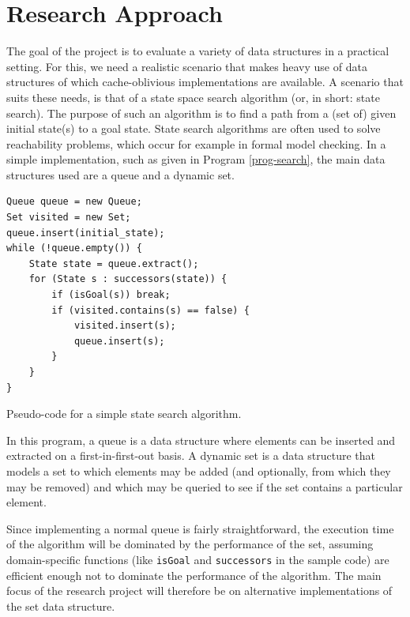 \documentclass{acm_proc_article-sp}
\begin{document}
\section{Research Approach}
The goal of the project is to evaluate a variety of data structures in a practical setting. For this, we need a realistic scenario that makes heavy use of data structures of which cache-oblivious implementations are available. A scenario that suits these needs, is that of a state space search algorithm (or, in short: state search). The purpose of such an algorithm is to find a path from a (set of) given initial state(s) to a goal state. State search algorithms are often used to solve reachability problems, which occur for example in formal model checking. In a simple implementation, such as given in Program \ref{prog-search}, the main data structures used are a queue and a dynamic set.

\begin{program}
\begin{verbatim}
Queue queue = new Queue;
Set visited = new Set;
queue.insert(initial_state);
while (!queue.empty()) {
    State state = queue.extract();
    for (State s : successors(state)) {
        if (isGoal(s)) break;
        if (visited.contains(s) == false) {
            visited.insert(s);
            queue.insert(s);
        }
    }
}
\end{verbatim}
\caption{Pseudo-code for a simple state search algorithm.}
\label{prog-search}
\end{program}

In this program, a queue is a data structure where elements can be inserted and extracted on a first-in-first-out basis. A dynamic set is a data structure that models a set to which elements may be added (and optionally, from which they may be removed) and which may be queried to see if the set contains a particular element.

Since implementing a normal queue is fairly straightforward, the execution time of the algorithm will be dominated by the performance of the set, assuming domain-specific functions (like \verb#isGoal# and \verb#successors# in the sample code) are efficient enough not to dominate the performance of the algorithm. The main focus of the research project will therefore be on alternative implementations of the set data structure.

\end{document}
